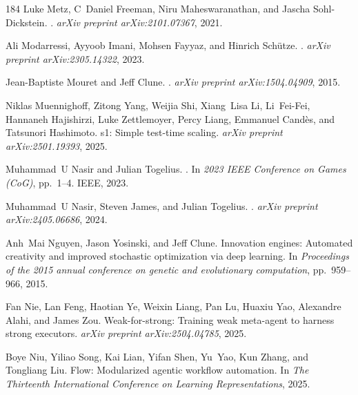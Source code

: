 \begin{thebibliography}{184}
Luke Metz, C~Daniel Freeman, Niru Maheswaranathan, and Jascha Sohl-Dickstein.
.
\newblock \emph{arXiv preprint arXiv:2101.07367}, 2021.

Ali Modarressi, Ayyoob Imani, Mohsen Fayyaz, and Hinrich Sch{\"u}tze.
.
\newblock \emph{arXiv preprint arXiv:2305.14322}, 2023.

Jean-Baptiste Mouret and Jeff Clune.
.
\newblock \emph{arXiv preprint arXiv:1504.04909}, 2015.

Niklas Muennighoff, Zitong Yang, Weijia Shi, Xiang~Lisa Li, Li~Fei-Fei,
  Hannaneh Hajishirzi, Luke Zettlemoyer, Percy Liang, Emmanuel Cand{\`e}s, and
  Tatsunori Hashimoto.
\newblock s1: Simple test-time scaling.
\newblock \emph{arXiv preprint arXiv:2501.19393}, 2025.

Muhammad~U Nasir and Julian Togelius.
.
\newblock In \emph{2023 IEEE Conference on Games (CoG)}, pp.\  1--4. IEEE,
  2023.

Muhammad~U Nasir, Steven James, and Julian Togelius.
.
\newblock \emph{arXiv preprint arXiv:2405.06686}, 2024.

Anh~Mai Nguyen, Jason Yosinski, and Jeff Clune.
\newblock Innovation engines: Automated creativity and improved stochastic
  optimization via deep learning.
\newblock In \emph{Proceedings of the 2015 annual conference on genetic and
  evolutionary computation}, pp.\  959--966, 2015.

Fan Nie, Lan Feng, Haotian Ye, Weixin Liang, Pan Lu, Huaxiu Yao, Alexandre
  Alahi, and James Zou.
\newblock Weak-for-strong: Training weak meta-agent to harness strong
  executors.
\newblock \emph{arXiv preprint arXiv:2504.04785}, 2025.

Boye Niu, Yiliao Song, Kai Lian, Yifan Shen, Yu~Yao, Kun Zhang, and Tongliang
  Liu.
\newblock Flow: Modularized agentic workflow automation.
\newblock In \emph{The Thirteenth International Conference on Learning
  Representations}, 2025.


\end{thebibliography}
